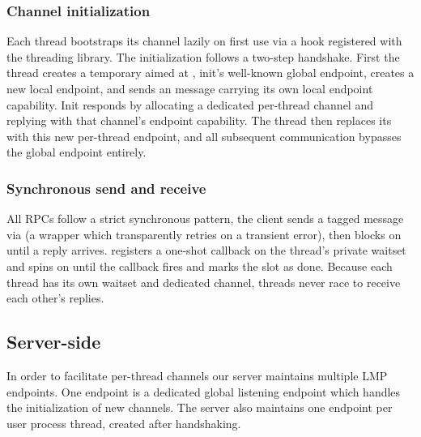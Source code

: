 \subsubsection{Channel initialization}
Each thread bootstraps its channel lazily on first use via a hook registered with the threading library.
The initialization follows a two-step handshake. First the thread creates a temporary  aimed at
, init's well-known global endpoint, creates a new local endpoint, and sends an  message carrying
its own local endpoint capability. Init responds by allocating a dedicated per-thread channel and replying with
that channel's endpoint capability. The thread then replaces its  with this new per-thread endpoint,
and all subsequent communication bypasses the global endpoint entirely.

\subsubsection{Synchronous send and receive}
All RPCs follow a strict synchronous pattern, the client sends a tagged message via  (a  wrapper which transparently retries on a transient error), then
blocks on  until a reply arrives.  registers a one-shot callback on the
thread's private waitset and spins on  until the callback fires and marks the slot
as done. Because each thread has its own waitset and dedicated channel, threads never race to receive each
other's replies.

\subsection{Server-side}
In order to facilitate per-thread channels our server maintains multiple LMP endpoints. One endpoint is a dedicated
global listening endpoint which handles the initialization of new channels. The server also maintains one endpoint per
user process thread, created after handshaking.


